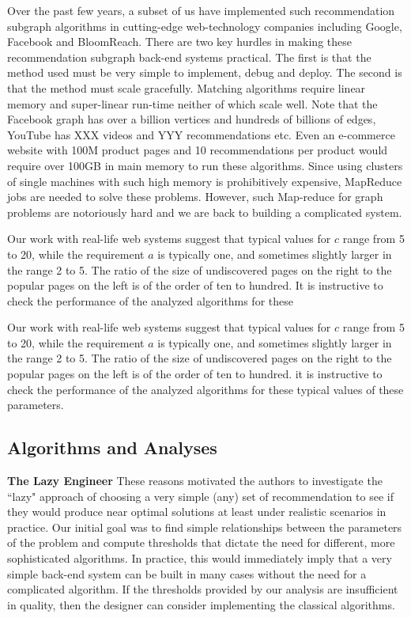 Over the past few years, a subset of us have implemented such recommendation
subgraph algorithms in cutting-edge web-technology companies including Google,
Facebook and BloomReach. There are two key hurdles in making these
recommendation subgraph back-end systems practical. The first is that the method
used must be very simple to implement, debug and deploy. The second is that the
method must scale gracefully.  Matching algorithms require linear memory and
super-linear run-time neither of which scale well. Note that the Facebook graph
has over a billion vertices\cite{} and hundreds of billions of edges\cite{},
YouTube has XXX videos and YYY recommendations\cite{} etc. Even an e-commerce
website with 100M product pages and 10 recommendations per product would require
over 100GB in main memory to run these algorithms. Since using clusters of
single machines with such high memory is prohibitively expensive, MapReduce
\cite{} jobs are needed to solve these problems. However, such Map-reduce for
graph problems are notoriously hard and we are back to building a complicated
system. \vs

Our work with real-life web systems suggest that typical values for $c$ range
from 5 to 20, while the requirement $a$ is typically one, and sometimes slightly
larger in the range 2 to 5. The ratio of the size of undiscovered pages on the
right to the popular pages on the left is of the order of ten to hundred. It is
instructive to check the performance of the analyzed algorithms for these

Our work with real-life web systems suggest that typical values for $c$ range
from 5 to 20, while the requirement $a$ is typically one, and sometimes slightly
larger in the range 2 to 5. The ratio of the size of undiscovered pages on the
right to the popular pages on the left is of the order of ten to hundred. it is
instructive to check the performance of the analyzed algorithms for these
typical values of these parameters.

\subsection{Algorithms and Analyses}

{\bf The Lazy Engineer}
These reasons motivated the authors to investigate the ``lazy" approach of
choosing a very simple (any) set of recommendation to see if they would produce
near optimal solutions at least under realistic scenarios in practice. Our
initial goal was to find simple relationships between the parameters of the
problem and compute thresholds that dictate the need for different, more
sophisticated algorithms. In practice, this would immediately imply that a very
simple back-end system can be built in many cases without the need for a
complicated algorithm. If the thresholds provided by our analysis are
insufficient in quality, then the designer can consider implementing the
classical algorithms. \vs


